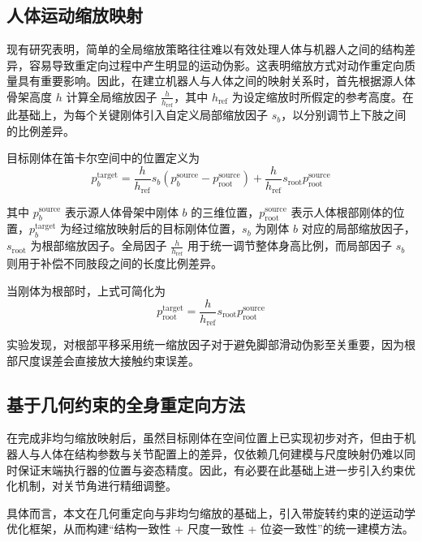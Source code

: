 \subsection{人体运动缩放映射}

现有研究表明，简单的全局缩放策略往往难以有效处理人体与机器人之间的结构差异，容易导致重定向过程中产生明显的运动伪影。这表明缩放方式对动作重定向质量具有重要影响。因此，在建立机器人与人体之间的映射关系时，首先根据源人体骨架高度 $h$ 计算全局缩放因子 $\frac{h}{h_{\text{ref}}}$，其中 $h_{\text{ref}}$ 为设定缩放时所假定的参考高度。在此基础上，为每个关键刚体引入自定义局部缩放因子 $s_b$，以分别调节上下肢之间的比例差异。

目标刚体在笛卡尔空间中的位置定义为
\begin{equation}
	p^{\text{target}}_b = \frac{h}{h_{\text{ref}}} s_b \left(p^{\text{source}}_b - p^{\text{source}}_{\text{root}}\right) + \frac{h}{h_{\text{ref}}} s_{\text{root}} p^{\text{source}}_{\text{root}}
\end{equation}

其中 $p^{\text{source}}_b$ 表示源人体骨架中刚体 $b$ 的三维位置，$p^{\text{source}}_{\text{root}}$ 表示人体根部刚体的位置，$p^{\text{target}}_b$ 为经过缩放映射后的目标刚体位置，$s_b$ 为刚体 $b$ 对应的局部缩放因子，$s_{\text{root}}$ 为根部缩放因子。全局因子 $\frac{h}{h_{\text{ref}}}$ 用于统一调节整体身高比例，而局部因子 $s_b$ 则用于补偿不同肢段之间的长度比例差异。

当刚体为根部时，上式可简化为
\begin{equation}
	p^{\text{target}}_{\text{root}} = \frac{h}{h_{\text{ref}}} s_{\text{root}} p^{\text{source}}_{\text{root}}
\end{equation}

实验发现，对根部平移采用统一缩放因子对于避免脚部滑动伪影至关重要，因为根部尺度误差会直接放大接触约束误差。

 \subsection{基于几何约束的全身重定向方法}
 
 在完成非均匀缩放映射后，虽然目标刚体在空间位置上已实现初步对齐，但由于机器人与人体在结构参数与关节配置上的差异，仅依赖几何建模与尺度映射仍难以同时保证末端执行器的位置与姿态精度。因此，有必要在此基础上进一步引入约束优化机制，对关节角进行精细调整。
 
 具体而言，本文在几何重定向与非均匀缩放的基础上，引入带旋转约束的逆运动学优化框架，从而构建“结构一致性 + 尺度一致性 + 位姿一致性”的统一建模方法。
 
